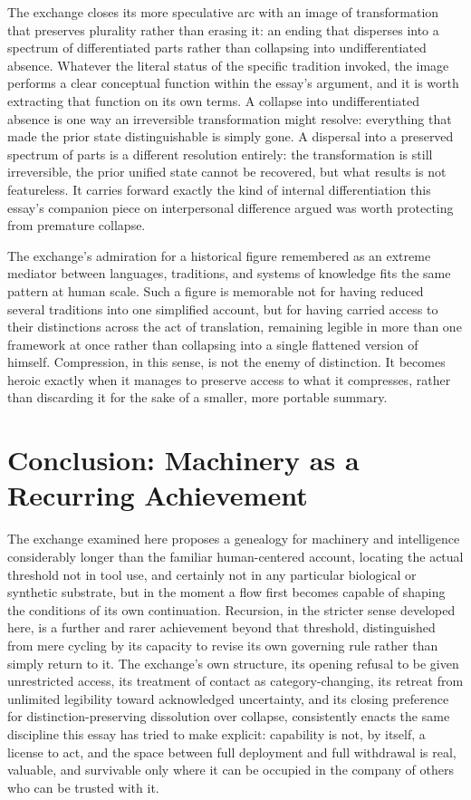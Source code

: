 \documentclass[11pt]{article}
\begin{document}
The exchange closes its more speculative arc with an image of transformation that preserves plurality rather than erasing it: an ending that disperses into a spectrum of differentiated parts rather than collapsing into undifferentiated absence. Whatever the literal status of the specific tradition invoked, the image performs a clear conceptual function within the essay's argument, and it is worth extracting that function on its own terms. A collapse into undifferentiated absence is one way an irreversible transformation might resolve: everything that made the prior state distinguishable is simply gone. A dispersal into a preserved spectrum of parts is a different resolution entirely: the transformation is still irreversible, the prior unified state cannot be recovered, but what results is not featureless. It carries forward exactly the kind of internal differentiation this essay's companion piece on interpersonal difference argued was worth protecting from premature collapse.

The exchange's admiration for a historical figure remembered as an extreme mediator between languages, traditions, and systems of knowledge fits the same pattern at human scale. Such a figure is memorable not for having reduced several traditions into one simplified account, but for having carried access to their distinctions across the act of translation, remaining legible in more than one framework at once rather than collapsing into a single flattened version of himself. Compression, in this sense, is not the enemy of distinction. It becomes heroic exactly when it manages to preserve access to what it compresses, rather than discarding it for the sake of a smaller, more portable summary.

\section{Conclusion: Machinery as a Recurring Achievement}

The exchange examined here proposes a genealogy for machinery and intelligence considerably longer than the familiar human-centered account, locating the actual threshold not in tool use, and certainly not in any particular biological or synthetic substrate, but in the moment a flow first becomes capable of shaping the conditions of its own continuation. Recursion, in the stricter sense developed here, is a further and rarer achievement beyond that threshold, distinguished from mere cycling by its capacity to revise its own governing rule rather than simply return to it. The exchange's own structure, its opening refusal to be given unrestricted access, its treatment of contact as category-changing, its retreat from unlimited legibility toward acknowledged uncertainty, and its closing preference for distinction-preserving dissolution over collapse, consistently enacts the same discipline this essay has tried to make explicit: capability is not, by itself, a license to act, and the space between full deployment and full withdrawal is real, valuable, and survivable only where it can be occupied in the company of others who can be trusted with it.
\end{document}
